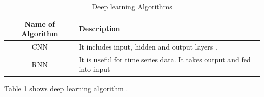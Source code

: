 \begin{table}[]
    \centering
    \caption{Deep learning Algorithms \cite{mondal_automatic_2017}}
    \begin{tabular}{cp{2in}} %
      \hline %
      \textbf{Name of Algorithm}   & \textbf{Description}  \\ \hline
        CNN & It includes input, hidden and output layers .\\ \hline
        RNN & It is useful for time series data. It takes output and fed into input \\ \hline
    \end{tabular}
        \label{tab:DL}
\end{table}

Table  \ref{tab:DL}     shows deep learning algorithm \cite{wiki_2016}.


